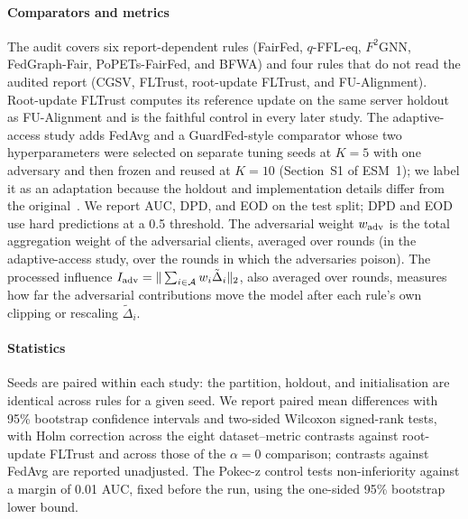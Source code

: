 \paragraph{Comparators and metrics}
The audit covers six report-dependent rules (FairFed, $q$-FFL-eq, $F^2$GNN, FedGraph-Fair, PoPETs-FairFed, and BFWA) and four rules that do not read the audited report (CGSV, FLTrust, root-update FLTrust, and FU-Alignment). Root-update FLTrust computes its reference update on the same server holdout as FU-Alignment and is the faithful control in every later study. The adaptive-access study adds FedAvg and a GuardFed-style comparator whose two hyperparameters were selected on separate tuning seeds at $K=5$ with one adversary and then frozen and reused at $K=10$ (Section~S1 of ESM~1); we label it as an adaptation because the holdout and implementation details differ from the original~\citep{li2025guardfed}. We report AUC, DPD, and EOD on the test split; DPD and EOD use hard predictions at a 0.5 threshold. The adversarial weight $w_{\rm adv}$ is the total aggregation weight of the adversarial clients, averaged over rounds (in the adaptive-access study, over the rounds in which the adversaries poison). The processed influence $I_{\rm adv} = \|\sum_{i \in \mathcal{A}} w_i \tilde{\Delta}_i\|_2$, also averaged over rounds, measures how far the adversarial contributions move the model after each rule's own clipping or rescaling $\tilde{\Delta}_i$.

\paragraph{Statistics}
Seeds are paired within each study: the partition, holdout, and initialisation are identical across rules for a given seed. We report paired mean differences with 95\% bootstrap confidence intervals and two-sided Wilcoxon signed-rank tests, with Holm correction across the eight dataset--metric contrasts against root-update FLTrust and across those of the $\alpha = 0$ comparison; contrasts against FedAvg are reported unadjusted. The Pokec-z control tests non-inferiority against a margin of 0.01 AUC, fixed before the run, using the one-sided 95\% bootstrap lower bound.

